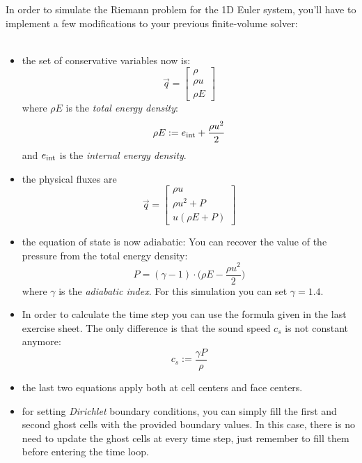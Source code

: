In order to simulate the Riemann problem for the 1D Euler 
system, you'll have to implement a few modifications 
to your previous finite-volume solver: \\
\\
\begin{itemize}
    \item the set of conservative variables now is:
        \begin{equation}
            \vec q=
            \begin{bmatrix}
                \rho \\ \rho u \\ \rho E 
            \end{bmatrix}
        \end{equation}
        where $\rho E$ is the \textit{total energy density}:
        \begin{equation}
            \rho E:=e_\textnormal{int}+\frac{\rho u^2}{2}
        \end{equation}
        and $e_\textnormal{int}$ is the 
        \textit{internal energy density}.
    \item the physical fluxes are 
        \begin{equation}
            \vec q=
            \begin{bmatrix}
                \rho u \\ \rho u^2+P \\ u(\rho E+P) 
            \end{bmatrix}
        \end{equation}
    \item the equation of state is now adiabatic: You can 
        recover the value of the pressure from the total
        energy density:
        \begin{equation}
            P=(\gamma-1)\cdot\bigg(
                \rho E-\frac{\rho u^2}{2}
            \bigg)
        \end{equation}
        where $\gamma$ is the \textit{adiabatic index}.
        For this simulation you can set $\gamma=1.4$.
    \item In order to calculate the time step you can 
        use the formula given in the last exercise sheet.
        The only difference is that the sound speed $c_s$
        is not constant anymore:
        \begin{equation}
            c_s:=\frac{\gamma P}{\rho}
        \end{equation}
    \item the last two equations apply both at 
        cell centers and face centers.
    \item for setting \textit{Dirichlet} boundary 
        conditions, you can simply fill the first and 
        second ghost cells with the provided boundary
        values. In this case, there is no need to update 
        the ghost cells at every time step, just remember
        to fill them before entering the time loop.
\end{itemize}
